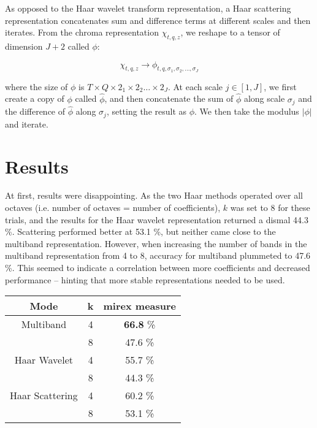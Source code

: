 \documentclass{article}
\begin{document}
	As opposed to the Haar wavelet transform representation, a Haar scattering representation concatenates sum and difference terms at different scales and then iterates. From the chroma representation $\chi_{t,q,z}$, we reshape to a tensor of dimension $J+2$ called $\phi$:
	
	\begin {equation}
	\chi_{t,q,z} \rightarrow \phi_{t,q,\sigma_1, \sigma_2, \ldots , \sigma_J}
	\end{equation}
	
	where the size of $\phi$ is $T \times Q \times 2_1 \times 2_2 \ldots \times 2_J$. At each scale $j \in [1, J]$, we first create a copy of $\phi$ called $\hat{\phi}$, and then concatenate the sum of $\hat{\phi}$ along scale $\sigma_j$ and the difference of $\hat{\phi}$ along $\sigma_j$, setting the result as $\phi$. We then take the modulus $| \phi | $ and iterate. 
	

\section{Results}\label{sec:results}

	At first, results were disappointing. As the two Haar methods operated over all octaves (i.e. number of octaves = number of coefficients), $k$ was set to 8 for these trials, and the results for the Haar wavelet representation returned a dismal 44.3 \%. Scattering performed better at 53.1 \%, but neither came close to the multiband representation.  However, when increasing the number of bands in the multiband representation from 4 to 8, accuracy for multiband plummeted to 47.6 \%. This seemed to indicate a correlation between more coefficients and decreased performance -- hinting that more stable representations needed to be used.
	
	\begin{center}
	\begin{tabular} {| c | c | c |}
	\hline
	Mode & k & \textsf{mirex} measure \\
	\hline
	Multiband & 4 & \textbf{66.8} \% \\
	& 8 & 47.6 \% \\
	
	Haar Wavelet & 4 & 55.7 \% \\
	 & 8 & 44.3 \% \\
	 
	 Haar Scattering & 4 & 60.2 \% \\
	  & 8 & 53.1 \% \\
	\hline
	\end{tabular}
	\end{center}
	
\end{document}
